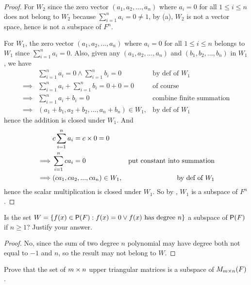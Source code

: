 \begin{proof}
For \(W_2\) since the zero vector \((a_1, a_2, ..., a_n)\) where \(a_i = 0\) for all \(1 \le i \le n\) does not belong to \(W_2\) because \(\sum_{i = 1}^{n} a_i = 0 \ne 1\), by (a), \(W_2\) is not a vector space, hence is not a subspace of \(F^n\).

For \(W_1\), the zero vector \((a_1, a_2, ..., a_n)\) where \(a_i = 0\) for all \(1 \le i \le n\) belongs to \(W_1\) since \(\sum_{i = 1}^{n} a_i = 0\).
Also, given any \((a_1, a_2, ..., a_n)\) and \((b_1, b_2, ..., b_n)\) in \(W_1\), we have
\begin{align*}
             & \sum_{i = 1}^{n} a_i = 0 \land \sum_{i = 1}^{n} b_i = 0 & \text{by def of \(W_1\)} \\
    \implies & \sum_{i = 1}^{n} a_i + \sum_{i = 1}^{n} b_i = 0 + 0 = 0 & \text{of course} \\
    \implies & \sum_{i = 1}^{n} a_i + b_i = 0 & \text{combine finite summation} \\
    \implies & (a_1 + b_1, a_2 + b_2, ..., a_n + b_n) \in W_1, & \text{by def of \(W_1\)}
\end{align*}
hence the addition is closed under \(W_1\).
And
\begin{align*}
             & c \sum_{i = 1}^{n} a_i = c \times 0 = 0 \\
    \implies & \sum_{i = 1}^{n} c a_i = 0 & \text{put constant into summation} \\
    \implies & (c a_1, c a_2, ..., c a_n) \in W_1, & \text{by def of \(W_1\)}
\end{align*}
hence the scalar multiplication is closed under \(W_1\).
So by , \(W_1\) is a subspace of \(F^n\).
\end{proof}

\begin{exercise} \label{exercise 1.3.11}
Is the set \(W = \{f(x) \in \textsf{P}(F): f(x) = 0 \lor f(x) \text{ has degree } n\}\) a subspace of \(\textsf{P}(F)\) if \(n \ge 1\)?
Justify your answer.
\end{exercise}

\begin{proof}
No, since the sum of two degree \(n\) polynomial may have degree both not equal to \(-1\) and \(n\), so the result may not belong to \(W\).
\end{proof}

\begin{exercise} \label{exercise 1.3.12}
Prove that the set of \(m \times n\) upper triangular matrices is a subspace of \(M_{m \times n}(F)\).
\end{exercise}

